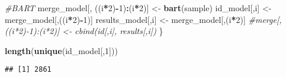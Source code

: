 \documentclass[]{article}
\newenvironment{Shaded}{\begin{snugshade}}{\end{snugshade}}
\newcommand{\CommentTok}[1]{\textcolor[rgb]{0.56,0.35,0.01}{\textit{#1}}}
\newcommand{\DecValTok}[1]{\textcolor[rgb]{0.00,0.00,0.81}{#1}}
\newcommand{\KeywordTok}[1]{\textcolor[rgb]{0.13,0.29,0.53}{\textbf{#1}}}
\newcommand{\NormalTok}[1]{#1}
\newcommand{\OperatorTok}[1]{\textcolor[rgb]{0.81,0.36,0.00}{\textbf{#1}}}
\newcommand{\StringTok}[1]{\textcolor[rgb]{0.31,0.60,0.02}{#1}}
\begin{document}
\begin{Shaded}
\begin{Highlighting}[]
  \CommentTok{#BART}
\NormalTok{  merge_model[, ((i}\OperatorTok{*}\DecValTok{2}\NormalTok{)}\OperatorTok{-}\DecValTok{1}\NormalTok{)}\OperatorTok{:}\NormalTok{(i}\OperatorTok{*}\DecValTok{2}\NormalTok{)] <-}\StringTok{ }\KeywordTok{bart}\NormalTok{(sample)}
\NormalTok{  id_model[,i]  <-}\StringTok{ }\NormalTok{merge_model[,((i}\OperatorTok{*}\DecValTok{2}\NormalTok{)}\OperatorTok{-}\DecValTok{1}\NormalTok{)]}
\NormalTok{  results_model[,i] <-}\StringTok{ }\NormalTok{merge_model[,(i}\OperatorTok{*}\DecValTok{2}\NormalTok{)]}
  \CommentTok{#merge[, ((i*2)-1):(i*2)] <- cbind(id[,i], results[,i])}
\NormalTok{\}}
\end{Highlighting}
\end{Shaded}

\begin{Shaded}
\begin{Highlighting}[]
\KeywordTok{length}\NormalTok{(}\KeywordTok{unique}\NormalTok{(id_model[,}\DecValTok{1}\NormalTok{]))}
\end{Highlighting}
\end{Shaded}

\begin{verbatim}
## [1] 2861
\end{verbatim}
\end{document}
